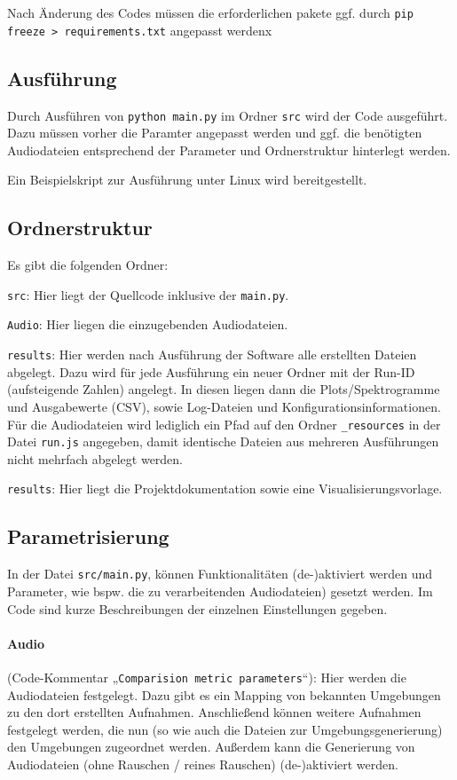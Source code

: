 \documentclass[
	fontsize=10.5pt,
	marginpar=false,
	ngerman,
	accentcolor=3d
	]{tudapub}
\begin{document}
Nach Änderung des Codes müssen die erforderlichen pakete ggf. durch \texttt{pip freeze > requirements.txt} angepasst werdenx

\subsection{Ausführung}

Durch Ausführen von \texttt{python main.py} im Ordner \texttt{src} wird der Code ausgeführt. Dazu müssen vorher die Paramter angepasst werden und ggf. die benötigten Audiodateien entsprechend der Parameter und Ordnerstruktur hinterlegt werden.

Ein Beispielskript zur Ausführung unter Linux wird bereitgestellt.

\subsection{Ordnerstruktur}

Es gibt die folgenden Ordner:

\texttt{src}: Hier liegt der Quellcode inklusive der \texttt{main.py}.

\texttt{Audio}: Hier liegen die einzugebenden Audiodateien.

\texttt{results}: Hier werden nach Ausführung der Software alle erstellten Dateien abgelegt. Dazu wird für jede Ausführung ein neuer Ordner mit der Run-ID (aufsteigende Zahlen) angelegt. In diesen liegen dann die Plots/Spektrogramme und Ausgabewerte (CSV), sowie Log-Dateien und Konfigurationsinformationen. Für die Audiodateien wird lediglich ein Pfad auf den Ordner \texttt{\_resources} in der Datei \texttt{run.js} angegeben, damit identische Dateien aus mehreren Ausführungen nicht mehrfach abgelegt werden.

\texttt{results}: Hier liegt die Projektdokumentation sowie eine Visualisierungsvorlage.

\subsection{Parametrisierung}
In der Datei \texttt{src/main.py}, können Funktionalitäten (de-)aktiviert werden und Parameter, wie bspw. die zu verarbeitenden Audiodateien) gesetzt werden. Im Code sind kurze Beschreibungen der einzelnen Einstellungen gegeben.

\paragraph{Audio} (Code-Kommentar „\texttt{Comparision metric parameters}“): Hier werden die Audiodateien festgelegt. Dazu gibt es ein Mapping von bekannten Umgebungen zu den dort erstellten Aufnahmen. Anschließend können weitere Aufnahmen festgelegt werden, die nun (so wie auch die Dateien zur Umgebungsgenerierung) den Umgebungen zugeordnet werden. Außerdem kann die Generierung von Audiodateien (ohne Rauschen / reines Rauschen) (de-)aktiviert werden.
\end{document}
